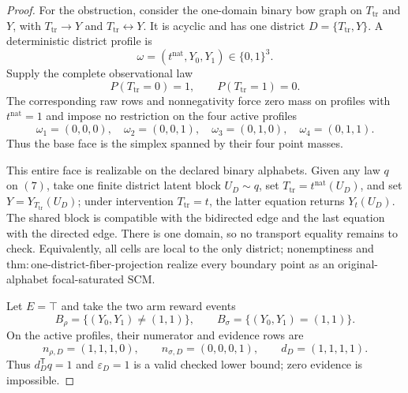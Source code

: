 \documentclass{article}
\begin{document}
\begin{proof}
For the obstruction, consider the one-domain binary bow graph on
\(T_{\mathrm{tr}}\) and \(Y\), with
\(T_{\mathrm{tr}}\to Y\) and \(T_{\mathrm{tr}}\leftrightarrow Y\).  It is acyclic
and has one district \(D=\{T_{\mathrm{tr}},Y\}\).  A deterministic district profile
is
\[
\omega=(t^{\mathrm{nat}},Y_0,Y_1)\in\{0,1\}^3.
\tag{5}
\]
Supply the complete observational law
\[
P(T_{\mathrm{tr}}=0)=1,
\qquad P(T_{\mathrm{tr}}=1)=0.
\tag{6}
\]
The corresponding raw rows and nonnegativity force zero mass on profiles with
\(t^{\mathrm{nat}}=1\) and impose no restriction on the four active profiles
\[
\omega_1=(0,0,0),\quad
\omega_2=(0,0,1),\quad
\omega_3=(0,1,0),\quad
\omega_4=(0,1,1).
\tag{7}
\]
Thus the base face is the simplex spanned by their four point masses.

This entire face is realizable on the declared binary alphabets.  Given any law
\(q\) on \((7)\), take one finite district latent block \(U_D\sim q\), set
\(T_{\mathrm{tr}}=t^{\mathrm{nat}}(U_D)\), and set
\(Y=Y_{T_{\mathrm{tr}}}(U_D)\); under intervention
\(T_{\mathrm{tr}}=t\), the latter equation returns \(Y_t(U_D)\).  The shared block
is compatible with the bidirected edge and the last equation with the directed edge.
There is one domain, so no transport equality remains to check.  Equivalently, all
cells are local to the only district; nonemptiness and
\(\mathrm{thm:one\text{-}district\text{-}fiber\text{-}projection}\) realize every
boundary point as an original-alphabet focal-saturated SCM.

Let \(E=\top\) and take the two arm reward events
\[
B_\rho=\{(Y_0,Y_1)\ne(1,1)\},
\qquad
B_\sigma=\{(Y_0,Y_1)=(1,1)\}.
\tag{8}
\]
On the active profiles, their numerator and evidence rows are
\[
n_{\rho,D}=(1,1,1,0),\qquad
n_{\sigma,D}=(0,0,0,1),\qquad
d_D=(1,1,1,1).
\tag{9}
\]
Thus \(d_D^{\mathsf T}q=1\) and \(\varepsilon_D=1\) is a valid checked lower
bound; zero evidence is impossible.


\end{proof}
\end{document}
